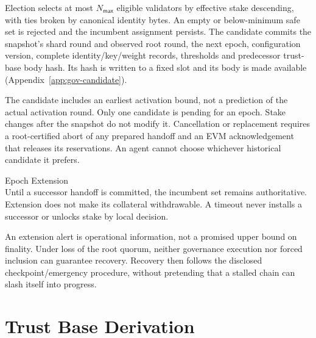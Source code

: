 Election selects at most $N_\mathsf{max}$ eligible validators by effective stake descending, with ties broken by canonical identity bytes. An empty or below-minimum safe set is rejected and the incumbent assignment persists. The candidate commits the snapshot's shard round and observed root round, the next epoch, configuration version, complete identity/key/weight records, thresholds and predecessor trust-base body hash. Its hash is written to a fixed slot and its body is made available (Appendix~\ref{app:gov-candidate}).

The candidate includes an earliest activation bound, not a prediction of the actual activation round. Only one candidate is pending for an epoch. Stake changes after the snapshot do not modify it. Cancellation or replacement requires a root-certified abort of any prepared handoff and an EVM acknowledgement that releases its reservations. An agent cannot choose whichever historical candidate it prefers.

\begin{ruledef*}{Epoch Extension} \\
 Until a successor handoff is committed, the incumbent set remains authoritative. Extension does not make its collateral withdrawable. A timeout never installs a successor or unlocks stake by local decision.
\end{ruledef*}

An extension alert is operational information, not a promised upper bound on finality. Under loss of the root quorum, neither governance execution nor forced inclusion can guarantee recovery. Recovery then follows the disclosed checkpoint/emergency procedure, without pretending that a stalled chain can slash itself into progress.

\section{Trust Base Derivation}\label{sec:gov-trust-base}


